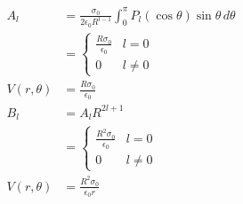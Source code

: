 \documentclass{article}
\begin{document}
\begin{enumerate}
        \begin{align*}
          A_l          & = \frac{\sigma_0}{2 \epsilon_0 R^{l - 1}} \int_0^\pi P_l(\cos \theta) \sin \theta \,d \theta \\
                       & = \begin{cases}
                             \frac{R \sigma_0}{\epsilon_0} & l = 0   \\
                             0                             & l \ne 0
                           \end{cases}                                                    \\
          V(r, \theta) & = \frac{R \sigma_0}{\epsilon_0}                                                              \\
          B_l          & = A_l R^{2 l + 1}                                                                            \\
                       & = \begin{cases}
                             \frac{R^2 \sigma_0}{\epsilon_0} & l = 0   \\
                             0                               & l \ne 0
                           \end{cases}                                                  \\
          V(r, \theta) & = \frac{R^2 \sigma_0}{\epsilon_0 r}
        \end{align*}
\end{enumerate}

\subsection{}
\end{document}
